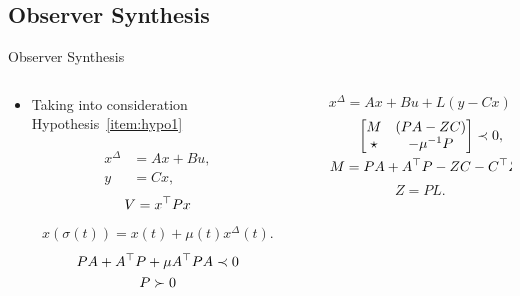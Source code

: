 
\subsection{Observer Synthesis}%
\label{subsec:ts-observer-synthesis}

\begin{slide}{Observer Synthesis}
  \begin{columns}[c]
    \begin{column}{0.55\textwidth}
      \begin{itemize}
        \item Taking into consideration Hypothesis~\ref{item:hypo1}
      \end{itemize}
      \begin{align}
        x^{\Delta} & = Ax + Bu, \\
        y          & = Cx,
      \end{align}
      \begin{gather}
        V = x^{\top}{}Px
      \end{gather}
      \begin{gather}
        x(\sigma(t)) = x(t) + \mu(t)x^{\Delta}(t).
      \end{gather}
      \begin{gather}
        PA + A^{\top}{}P + \mu{}A^{\top}{}PA \prec{} 0 \\
        P \succ{} 0
      \end{gather}
    \end{column}%
    \hfill%
    \begin{column}{0.55\textwidth}
      \begin{equation}
        x^{\Delta} = Ax + Bu + L(y - Cx).
      \end{equation}
      \begin{gather}
        \begin{bmatrix}
          M     & (PA - ZC)  \\
          \star & -\mu^{-1}P
        \end{bmatrix} \prec{} 0,  \\
        M = PA + A^{\top}{}P - ZC - C^{\top}{}Z^{\top}{}.
      \end{gather}
      \begin{equation}
        Z = PL.
      \end{equation}
    \end{column}%
  \end{columns}
\end{slide}

